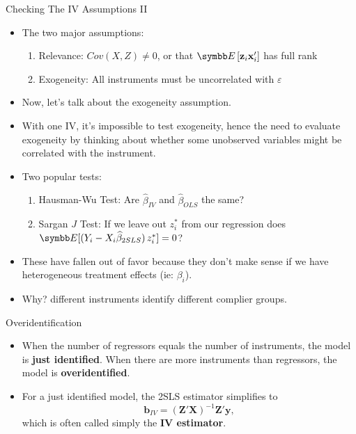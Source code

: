 \documentclass[aspectratio=169,11pt]{beamer}
\begin{document}
\begin{frame}{Checking The IV Assumptions II}

\begin{itemize}
\item The two major assumptions:
\begin{enumerate}
	\item Relevance: $Cov(X,Z)\ne 0$, or that $\E\left[{\bf z}_i {\bf x}_i' \right]$ has full rank

	\item Exogeneity: All instruments must be uncorrelated with $\varepsilon$
\end{enumerate}
\smallskip
	\item Now, let's talk about the exogeneity assumption.
	\item With one IV, it's impossible to test exogeneity, hence
	the need to evaluate exogeneity by thinking about whether
	some unobserved variables might be correlated with the instrument.
	\item Two popular tests:
	\begin{enumerate}
		\item Hausman-Wu Test: Are $\widehat{\beta}_{IV}$ and $\widehat{\beta}_{OLS}$ the same?
		\item Sargan $J$ Test: If we leave out $z_{i}^{*}$ from our regression does $\E[(Y_i -  X_i \widehat{\beta}_{2SLS})\, z_i^*]=0$?
	\end{enumerate}
	\item These have fallen out of favor because they don't make sense if we have \alert{heterogeneous treatment effects} (ie: $\beta_i$).
	\item Why? \alert{different instruments} identify \alert{different complier} groups.
\end{itemize}
\end{frame}



\begin{frame}{Overidentification}
\begin{itemize}
	\item When the number of regressors equals the number of instruments,
	the model is {\bf just identified}. When there are
	more instruments than regressors, the model is {\bf overidentified}.

	\medskip
	\item For a just identified model, the 2SLS estimator simplifies to\[
	\mathbf{b}_{IV}=\left(\mathbf{Z}'\mathbf{X}\right)^{-1}\mathbf{Z}'\mathbf{y},
	\]
	which is often called simply the {\bf IV estimator}.

	\medskip
\end{itemize}
\end{frame}
\end{document}
